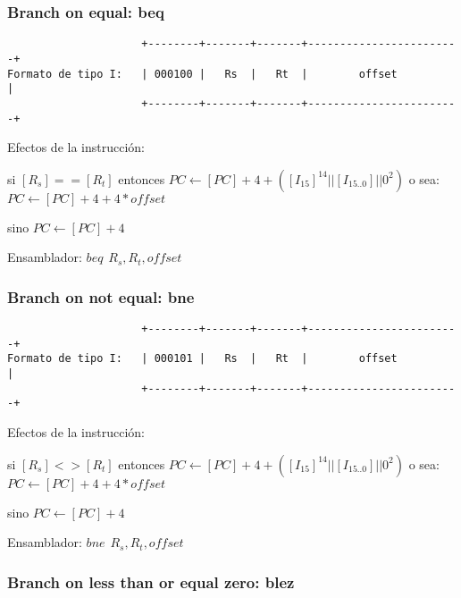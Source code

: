 \documentclass[letterpaper,11pt]{scrartcl}
\begin{document}

\subsubsection*{Branch on equal: \textbf{beq}}

\begin{verbatim}
                     +--------+-------+-------+------------------------+ 
Formato de tipo I:   | 000100 |   Rs  |   Rt  |        offset          | 
                     +--------+-------+-------+------------------------+ 
\end{verbatim}

Efectos de la instrucción: 

si $[R_{s}] == [R_{t}]$ entonces $PC \leftarrow [PC] + 4 + ( [I_{15}]^{14} || [I_{15..0}] || 0^{2} )$ o sea: $PC \leftarrow [PC] + 4 + 4*offset$

sino $PC \leftarrow [PC] + 4$

Ensamblador: $beq\hspace{5pt}R_{s}, R_{t}, offset$


\subsubsection*{Branch on not equal: \textbf{bne}}

\begin{verbatim}
                     +--------+-------+-------+------------------------+ 
Formato de tipo I:   | 000101 |   Rs  |   Rt  |        offset          | 
                     +--------+-------+-------+------------------------+ 
\end{verbatim}

Efectos de la instrucción: 

si $[R_{s}] <> [R_{t}]$ entonces $PC \leftarrow [PC] + 4 + ( [I_{15}]^{14} || [I_{15..0}] || 0^{2} )$ o sea: $PC \leftarrow [PC] + 4 + 4*offset$

sino $PC \leftarrow [PC] + 4$

Ensamblador: $bne\hspace{5pt}R_{s}, R_{t}, offset$


\subsubsection*{Branch on less than or equal zero: \textbf{blez}}
\end{document}
